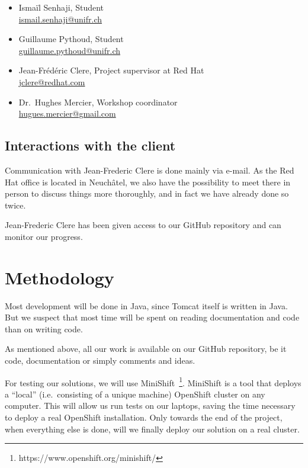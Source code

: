 \documentclass[11pt,a4paper]{article}
\begin{document}
\begin{itemize}
    \item Ismaïl Senhaji, Student \\
        \href{mailto:ismail.senhaji@unifr.ch}{ismail.senhaji@unifr.ch}
    \item Guillaume Pythoud, Student \\
        \href{mailto:guillaume.pythoud@unifr.ch}{guillaume.pythoud@unifr.ch}
    \item Jean-Frédéric Clere, Project supervisor at Red Hat \\
        \href{mailto: jclere@redhat.com}{jclere@redhat.com}
    \item Dr.\ Hughes Mercier, Workshop coordinator \\
        \href{mailto: hugues.mercier@gmail.com}{hugues.mercier@gmail.com}
\end{itemize}

\subsection{Interactions with the client}

Communication with Jean-Frederic Clere is done mainly via e-mail. As the Red
Hat office is located in Neuchâtel, we also have the possibility to meet there
in person to discuss things more thoroughly, and in fact we have already done
so twice.

Jean-Frederic Clere has been given access to our GitHub repository and can
monitor our progress.

\section{Methodology}

Most development will be done in Java, since Tomcat itself is written in Java.
But we suspect that most time will be spent on reading documentation and code
than on writing code.

As mentioned above, all our work is available on our GitHub repository, be it
code, documentation or simply comments and ideas.

For testing our solutions, we will use
MiniShift~\footnote{https://www.openshift.org/minishift/}. MiniShift is a tool
that deploys a ``local'' (i.e.\ consisting of a unique machine) OpenShift
cluster on any computer. This will allow us run tests on our laptops, saving
the time necessary to deploy a real OpenShift installation. Only towards the
end of the project, when everything else is done, will we finally deploy our
solution on a real cluster.
\end{document}
